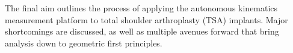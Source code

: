 The final aim outlines the process of applying the autonomous kinematics measurement platform to total shoulder arthroplasty (TSA) implants.
Major shortcomings are discussed, as well as multiple avenues forward that bring analysis down to geometric first principles.



